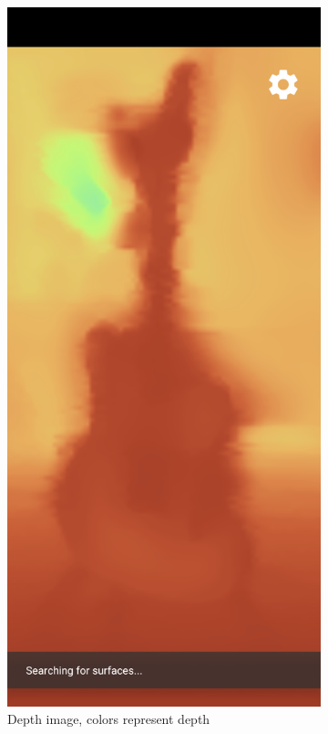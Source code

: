 \begin{figure}[ht!]
    \centering
    \begin{subfigure}[t]{.45\textwidth}
        \centering
        \includegraphics[width=.8\textwidth]{images/depth_api_hello_world_depth}
        \caption{Depth image, colors represent depth}
    \end{subfigure}\hfill
    \begin{subfigure}[t]{.45\textwidth}
        \centering

\end{subfigure}
\end{figure}
